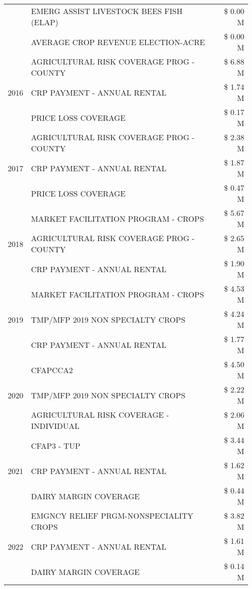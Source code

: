 \begin{tabular}{llr}
 & EMERG ASSIST LIVESTOCK BEES FISH (ELAP) & \$ 0.00 M \\
 & AVERAGE CROP REVENUE ELECTION-ACRE & \$ 0.00 M \\
\cline{1-3}
\multirow[t]{3}{*}{2016} & AGRICULTURAL RISK COVERAGE PROG - COUNTY & \$ 6.88 M \\
 & CRP PAYMENT - ANNUAL RENTAL & \$ 1.74 M \\
 & PRICE LOSS COVERAGE & \$ 0.17 M \\
\cline{1-3}
\multirow[t]{3}{*}{2017} & AGRICULTURAL RISK COVERAGE PROG - COUNTY & \$ 2.38 M \\
 & CRP PAYMENT - ANNUAL RENTAL & \$ 1.87 M \\
 & PRICE LOSS COVERAGE & \$ 0.47 M \\
\cline{1-3}
\multirow[t]{3}{*}{2018} & MARKET FACILITATION PROGRAM - CROPS & \$ 5.67 M \\
 & AGRICULTURAL RISK COVERAGE PROG - COUNTY & \$ 2.65 M \\
 & CRP PAYMENT - ANNUAL RENTAL & \$ 1.90 M \\
\cline{1-3}
\multirow[t]{3}{*}{2019} & MARKET FACILITATION PROGRAM - CROPS & \$ 4.53 M \\
 & TMP/MFP 2019 NON SPECIALTY CROPS & \$ 4.24 M \\
 & CRP PAYMENT - ANNUAL RENTAL & \$ 1.77 M \\
\cline{1-3}
\multirow[t]{3}{*}{2020} & CFAPCCA2 & \$ 4.50 M \\
 & TMP/MFP 2019 NON SPECIALTY CROPS & \$ 2.22 M \\
 & AGRICULTURAL RISK COVERAGE - INDIVIDUAL & \$ 2.06 M \\
\cline{1-3}
\multirow[t]{3}{*}{2021} & CFAP3 - TUP & \$ 3.44 M \\
 & CRP PAYMENT - ANNUAL RENTAL & \$ 1.62 M \\
 & DAIRY MARGIN COVERAGE & \$ 0.44 M \\
\cline{1-3}
\multirow[t]{3}{*}{2022} & EMGNCY RELIEF PRGM-NONSPECIALITY CROPS & \$ 3.82 M \\
 & CRP PAYMENT - ANNUAL RENTAL & \$ 1.61 M \\
 & DAIRY MARGIN COVERAGE & \$ 0.14 M \\
\cline{1-3}
\bottomrule
\end{tabular}

